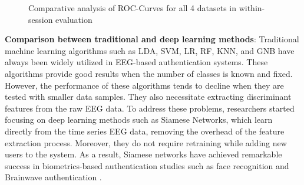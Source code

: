 \begin{figure}[htbp]
\begin{minipage}{0.42\textwidth}
    \end{minipage}
    
    \caption{Comparative analysis of ROC-Curves for all 4 datasets in within-session evaluation}
    \label{fig:WithinSession ROC Curve}
\end{figure}

\textbf{\large Comparison between traditional and deep learning methods}: 
Traditional machine learning algorithms such as LDA, SVM, LR, RF, KNN, and GNB have always been widely utilized in EEG-based authentication systems. These algorithms provide good results when the number of classes is known and fixed. However, the performance of these algorithms tends to decline when they are tested with smaller data samples. They also necessitate extracting discriminant features from the raw EEG data. To address these problems, researchers started focusing on deep learning methods such as Siamese Networks, which learn directly from the time series EEG data, removing the overhead of the feature extraction process. Moreover, they do not require retraining while adding new users to the system. As a result, Siamese networks have achieved remarkable success in biometrics-based authentication studies such as face recognition \cite{wu2017face, facenet, heidari2020using} and Brainwave authentication \cite{fallahi2023brainnet, maiorana2019eeg}. 
\smallskip

